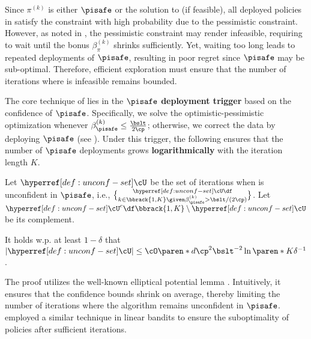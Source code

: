 Since $\pi^{(k)}$ is either $\pisafe$ or the solution to \optpes (if feasible), all deployed policies in  satisfy the constraint with high probability due to the pessimistic constraint.
However, as noted in , the pessimistic constraint may render \optpes infeasible, requiring  to wait until the bonus \(\beta^{(k)}_\pi\) shrinks sufficiently.  
Yet, waiting too long leads to repeated deployments of \(\pisafe\), resulting in poor regret since $\pisafe$ may be sub-optimal. Therefore, efficient exploration must ensure that the number of iterations where  is infeasible remains bounded.

The core technique of  lies in the \textbf{$\boldsymbol{\pisafe}$ deployment trigger} based on the confidence of $\pisafe$.
Specifically, we solve the optimistic-pessimistic optimization whenever 
$\beta^{(k)}_{\pisafe} \leq \frac{\bslt}{2\cp}$; otherwise, we correct the data by deploying $\pisafe$ (see ).
Under this trigger, the following  ensures that the number of $\pisafe$ deployments grows \textbf{logarithmically} with the iteration length $K$.
\begin{definition}\label{def:unconf-set}
Let $\unconfBandit$ be the set of iterations when  is unconfident in $\pisafe$, i.e., 
\(
\unconfBandit \df 
\brace{k \in \bbrack{1, K} \given 
\beta^{(k)}_{\pisafe} > \bslt / (2\cp)
}
\).
Let $\unconfBandit^c \df \bbrack{1, K} \setminus \unconfBandit$ be its complement.
\end{definition}
\begin{lemma}\label{lemma:Ck-bound-main}
It holds w.p. at least $1-\delta$ that
\(|\unconfBandit| \leq \cO\paren*{d\cp^2\bslt^{-2}\ln\paren*{K\delta^{-1}}}\).
\end{lemma}
The proof utilizes the well-known elliptical potential lemma \citep{abbasi2011improved}.
Intuitively, it ensures that the confidence bounds shrink on average, thereby limiting the number of iterations where the algorithm remains unconfident in $\pisafe$.
\citet{he2021uniform,zhang2023interplay} employed a similar technique in linear bandits to ensure the suboptimality of policies after sufficient iterations.


